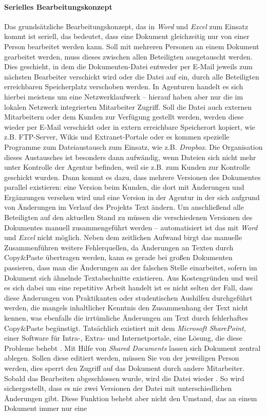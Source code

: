 \label{p:serielles-konzept}\paragraph{Serielles Bearbeitungskonzept} Das grundsätzliche Bearbeitungskonzept, das in \emph{Word} und \emph{Excel} zum Einsatz kommt ist seriell, das bedeutet, dass eine Dokument gleichzeitig nur von einer Person bearbeitet werden kann. Soll mit mehreren Personen an einem Dokument gearbeitet werden, muss dieses zwischen allen Beteiligten ausgetauscht werden. Dies geschieht, in dem die Dokumenten-Datei entweder per E-Mail jeweils zum nächsten Bearbeiter verschickt wird oder die Datei auf ein, durch alle Beteiligten erreichbaren Speicherplatz verschoben werden. In Agenturen handelt es sich hierbei meistens um eine Netzwerklaufwerk -- hierauf haben aber nur die im lokalen Netzwerk integrierten Mitarbeiter Zugriff. Soll die Datei auch externen Mitarbeitern oder dem Kunden zur Verfügung gestellt werden, werden diese wieder per E-Mail verschickt oder in extern erreichbare Speicherort kopiert, wie z.B. FTP-Server, Wikis und Extranet-Portale oder es kommen spezielle Programme zum Dateiaustausch zum Einsatz, wie z.B. \emph{Dropbox}. Die Organisation dieses Austausches ist besonders dann aufwändig, wenn Dateien sich nicht mehr unter Kontrolle der Agentur befinden, weil sie z.B. zum Kunden zur Kontrolle geschickt wurden. Dann kommt es dazu, dass mehrere Versionen des Dokumentes parallel existieren: eine Version beim Kunden, die dort mit Änderungen und Ergänzungen versehen wird und eine Version in der Agentur in der sich aufgrund von Änderungen im Verlauf des Projekts Text ändern. Um anschließend alle Beteiligten auf den aktuellen Stand zu müssen die verschiedenen Versionen des Dokumentes manuell zusammengeführt werden -- automatisiert ist das mit \emph{Word} und \emph{Excel} nicht möglich. Neben dem zeitlichen Aufwand birgt das manuelle Zusammenführen weitere Fehlerquellen, da Änderungen an Texten durch Copy\&Paste übertragen werden, kann es gerade bei großen Dokumenten passieren, dass man die Änderungen an der falschen Stelle einarbeitet, sofern im Dokument sich ähnelnde Textabschnitte existieren. Aus Kostengründen und weil es sich dabei um eine repetitive Arbeit handelt ist es nicht selten der Fall, dass diese Änderungen von Praktikanten oder studentischen Aushilfen durchgeführt werden, die mangels inhaltlicher Kenntnis den Zusammenhang der Text nicht kennen, was ebenfalls die irrtümliche Änderungen am Text durch fehlerhaftes Copy\&Paste begünstigt. Tatsächlich existiert mit dem \emph{Microsoft} \emph{SharePoint}, einer Software für Intra-, Extra- und Internetportale, eine Lösung, die diese Probleme behebt \cite{sharepoint-shared-documents}. Mit Hilfe von \emph{Shared Documents} lassen sich Dokument zentral ablegen. Sollen diese editiert werden, müssen Sie von der jeweiligen Person  werden, dies sperrt den Zugriff auf das Dokument durch andere Mitarbeiter. Sobald das Bearbeiten abgeschlossen wurde, wird die Datei wieder . So wird sichergestellt, dass es nie zwei Versionen der Datei mit unterschiedlichen Änderungen gibt. Diese Funktion behebt aber nicht den Umstand, das an einem Dokument immer nur eine 